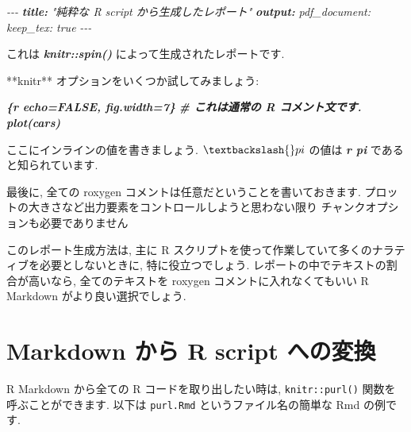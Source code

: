 \documentclass[
  11pt,
  lualatex,
  ja=standard]{bxjsreport}
\newenvironment{Shaded}{\begin{snugshade}}{\end{snugshade}}
\newcommand{\AnnotationTok}[1]{\textcolor[rgb]{0.56,0.35,0.01}{\textbf{\textit{#1}}}}
\newcommand{\CommentTok}[1]{\textcolor[rgb]{0.56,0.35,0.01}{\textit{#1}}}
\newcommand{\InformationTok}[1]{\textcolor[rgb]{0.56,0.35,0.01}{\textbf{\textit{#1}}}}
\newcommand{\NormalTok}[1]{#1}
\begin{document}
\begin{Shaded}
\begin{Highlighting}[]
\CommentTok{{-}{-}{-}}
\AnnotationTok{title:}\CommentTok{ "純粋な R script から生成したレポート"}
\AnnotationTok{output:}
\CommentTok{  pdf\_document:}
\CommentTok{    keep\_tex: true}
\CommentTok{{-}{-}{-}}

\NormalTok{これは }\InformationTok{\textasciigrave{}knitr::spin()\textasciigrave{}}\NormalTok{ によって生成されたレポートです.}

\NormalTok{**knitr** オプションをいくつか試してみましょう:}

\InformationTok{\textasciigrave{}\textasciigrave{}\textasciigrave{}\{r echo=FALSE, fig.width=7\}}
\InformationTok{\#  これは通常の R コメント文です.}
\InformationTok{plot(cars)}
\InformationTok{\textasciigrave{}\textasciigrave{}\textasciigrave{}}

\NormalTok{ここにインラインの値を書きましょう. $\textbackslash{}pi$ の値は}
\InformationTok{\textasciigrave{}\textasciigrave{}r  pi  \textasciigrave{}\textasciigrave{}}
\NormalTok{であると知られています.}

\NormalTok{最後に, 全ての roxygen コメントは任意だということを書いておきます.}
\NormalTok{プロットの大きさなど出力要素をコントロールしようと思わない限り}
\NormalTok{チャンクオプションも必要でありません}
\end{Highlighting}
\end{Shaded}

このレポート生成方法は, 主に R スクリプトを使って作業していて多くのナラティブを必要としないときに, 特に役立つでしょう. レポートの中でテキストの割合が高いなら, 全てのテキストを roxygen コメントに入れなくてもいい R Markdown がより良い選択でしょう.

\hypertarget{purl}{%
\section{Markdown から R script への変換}\label{purl}}

R Markdown から全ての R コードを取り出したい時は, \texttt{knitr::purl()} 関数を呼ぶことができます. 以下は \texttt{purl.Rmd} というファイル名の簡単な Rmd の例です.
\end{document}

